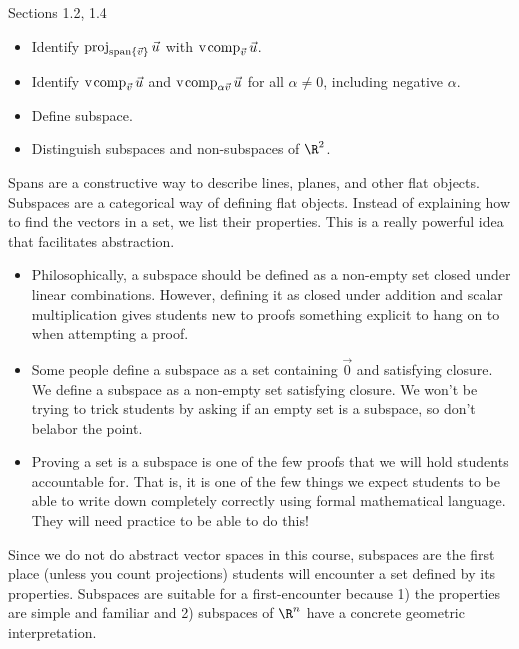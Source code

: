\documentclass{problemset}
\begin{document}
\begin{lesson}

	Sections 1.2, 1.4

	\begin{itemize}
		\item Identify $\operatorname{proj}_{\operatorname{span}\{\vec v\}}\vec u$ with $\operatorname{\operatorname{v\hspace{1pt}comp}}_{\vec v}\vec u$.
		\item Identify $\operatorname{\operatorname{v\hspace{1pt}comp}}_{\vec v}\vec u$ and $\operatorname{\operatorname{v\hspace{1pt}comp}}_{\alpha\vec v}\vec u$
			for all $\alpha\neq 0$, including negative $\alpha$.
		\item Define subspace.
		\item Distinguish subspaces and non-subspaces of $\R^2$.
	\end{itemize}

	Spans are a constructive way to describe lines, planes, and other
	flat objects. Subspaces are a categorical way of defining flat objects.
	Instead of explaining how to find the vectors in a set, we list their
	properties. This is a really powerful idea that facilitates abstraction.

	\begin{annotation}
		\begin{notes}
			\begin{itemize}
			\item	Philosophically, a subspace should be defined
			as a non-empty set closed under linear combinations.
			However, defining it as closed under addition and scalar
			multiplication gives students new to proofs
			something explicit to hang on to when attempting a proof.
			\item Some people define a subspace as a set containing
			$\vec 0$ and satisfying closure. We define a subspace
			as a non-empty set satisfying closure. We won't be trying
			to trick students by asking if an empty set is a subspace,
			so don't belabor the point.
			\item Proving a set is a subspace is one of the few proofs
				that we will hold students accountable for. That is,
					it is one of the few things we expect
					students to be able to write down completely
					correctly using formal mathematical language.
					They will need practice to be able to do this!
			\end{itemize}
		\end{notes}
	\end{annotation}
	Since we do not do abstract vector spaces in this course, subspaces are
	the first place (unless you count projections) students will encounter
	a set defined by its properties. Subspaces are suitable for a first-encounter
	because 1) the properties are simple and familiar and 2) subspaces of $\R^n$
	have a concrete geometric interpretation.

\end{lesson}
\end{document}
